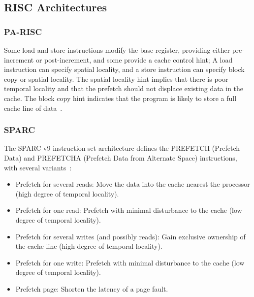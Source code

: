 \subsection{RISC Architectures}
\subsubsection{PA-RISC}
Some load and store instructions modify the base register, providing either pre-increment or post-increment, and some provide a cache control hint; A load instruction can specify spatial locality, and a store instruction can specify block copy or spatial locality. The spatial locality hint implies that there is poor temporal locality and that the prefetch should not displace existing data in the cache. The block copy hint indicates that the program is likely to store a full cache line of data~\cite{gccprefetch}.

\subsubsection{SPARC}
The SPARC v9 instruction set architecture defines the PREFETCH (Prefetch Data) and PREFETCHA (Prefetch Data from Alternate Space) instructions, with several variants~\cite{gccprefetch}:
\begin{itemize}
\item Prefetch for several reads: Move the data into the cache nearest the processor (high degree of temporal locality).
\item Prefetch for one read: Prefetch with minimal disturbance to the cache (low degree of temporal locality).
\item Prefetch for several writes (and possibly reads):  Gain exclusive ownership of the cache line (high degree of temporal locality).
\item Prefetch for one write:  Prefetch with minimal disturbance to the cache (low degree of temporal locality).
\item Prefetch page: Shorten the latency of a page fault.
\end{itemize}



